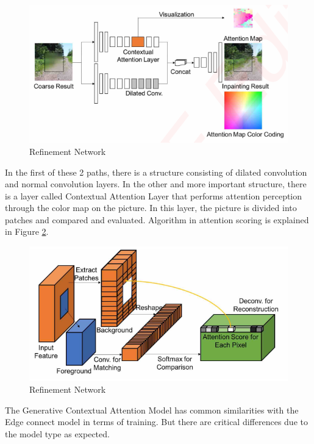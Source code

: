 \begin{figure}[h]
    \centering
    \includegraphics[scale=0.85]{figures/chapter4/GenerativeAttention.PNG}
    \caption{Refinement Network \cite{generative_contextual}}
    \label{fig:refinement-network}
\end{figure}

In the first of these 2 paths, there is a structure consisting of dilated convolution and normal convolution layers. In the other and more important structure, there is a layer called Contextual Attention Layer that performs attention perception through the color map on the picture. In this layer, the picture is divided into patches and compared and evaluated. Algorithm in attention scoring is explained in Figure \ref{fig:attention-scoring}.

\begin{figure}[h]
    \centering
    \includegraphics[scale=0.85]{figures/chapter4/GenerativeScoring.PNG}
    \caption{Refinement Network \cite{generative_contextual}}
    \label{fig:attention-scoring}
\end{figure}

The Generative Contextual Attention Model has common similarities with the Edge connect model in terms of training. But there are critical differences due to the model type as expected. 

